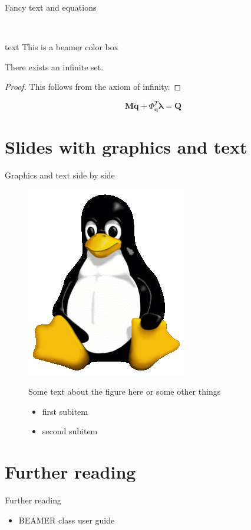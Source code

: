 \documentclass[11pt,t]{beamer}
\begin{document}
\begin{frame}{Fancy text and equations}
	\begin{center}~
		\begin{beamercolorbox}[wd=0.4\textwidth,rounded=true,center]{text}
			This is a beamer color box
		\end{beamercolorbox}
	\end{center}
	\begin{theorem}
		There exists an infinite set.
	\end{theorem}
	\begin{proof}
		This follows from the axiom of infinity.
	\end{proof}
	\vspace{4mm}
	\begin{equation}
		\textbf{M} \ddot{\textbf{q}} + \boldsymbol{\mathsf{\Phi}}_{\textbf{q}}^T \boldsymbol\lambda = \textbf{Q}
	\end{equation}
\end{frame}
\section{Slides with graphics and text}
\begin{frame}{Graphics and text side by side}
	\begin{figure}
		\begin{minipage}[b]{0.49\linewidth}
			\centering
			\includegraphics[width=.3\textwidth,natwidth=265,natheight=314]{Tux.png}
		\end{minipage}
		\hfill	
		\begin{minipage}[b]{0.5\linewidth}
			Some text about the figure here or some other things
			\begin{itemize}
				\item first subitem
				\item second subitem
			\end{itemize}
		\end{minipage}
	\end{figure}
\end{frame}
\section{Further reading}
\begin{frame}[t]{Further reading}
	\begin{itemize}
		\item BEAMER class user guide 
	\end{itemize}
\end{frame}
\end{document}
